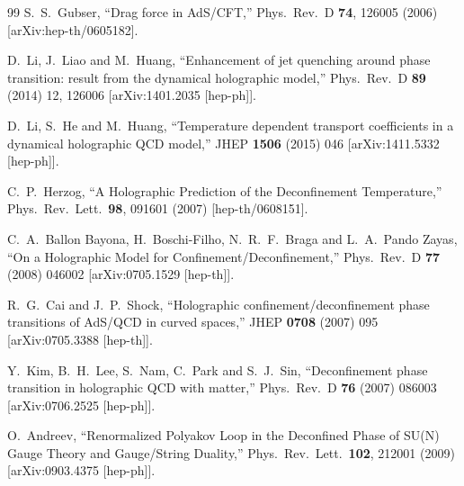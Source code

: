 \documentclass[11pt,a4paper,psfrag]{article}
\begin{document}
\begin{thebibliography}{99}
  S.~S.~Gubser,
  ``Drag force in AdS/CFT,''
  Phys.\ Rev.\  D {\bf 74}, 126005 (2006)
  [arXiv:hep-th/0605182].

  D.~Li, J.~Liao and M.~Huang,
  ``Enhancement of jet quenching around phase transition: result from the dynamical holographic model,''
  Phys.\ Rev.\ D {\bf 89} (2014) 12,  126006
  [arXiv:1401.2035 [hep-ph]].

  D.~Li, S.~He and M.~Huang,
  ``Temperature dependent transport coefficients in a dynamical holographic QCD model,''
  JHEP {\bf 1506} (2015) 046
  [arXiv:1411.5332 [hep-ph]].



  C.~P.~Herzog,
  ``A Holographic Prediction of the Deconfinement Temperature,''
  Phys.\ Rev.\ Lett.\  {\bf 98}, 091601 (2007)
  [hep-th/0608151].

  C.~A.~Ballon Bayona, H.~Boschi-Filho, N.~R.~F.~Braga and L.~A.~Pando Zayas,
  ``On a Holographic Model for Confinement/Deconfinement,''
  Phys.\ Rev.\ D {\bf 77} (2008) 046002
  [arXiv:0705.1529 [hep-th]].

  R.~G.~Cai and J.~P.~Shock,
  ``Holographic confinement/deconfinement phase transitions of AdS/QCD in curved spaces,''
  JHEP {\bf 0708} (2007) 095
  [arXiv:0705.3388 [hep-th]].

  Y.~Kim, B.~H.~Lee, S.~Nam, C.~Park and S.~J.~Sin,
  ``Deconfinement phase transition in holographic QCD with matter,''
  Phys.\ Rev.\ D {\bf 76} (2007) 086003
  [arXiv:0706.2525 [hep-ph]].

  O.~Andreev,
  ``Renormalized Polyakov Loop in the Deconfined Phase of SU(N) Gauge Theory and Gauge/String Duality,''
  Phys.\ Rev.\ Lett.\  {\bf 102}, 212001 (2009)
  [arXiv:0903.4375 [hep-ph]].


\end{thebibliography}
\end{document}
